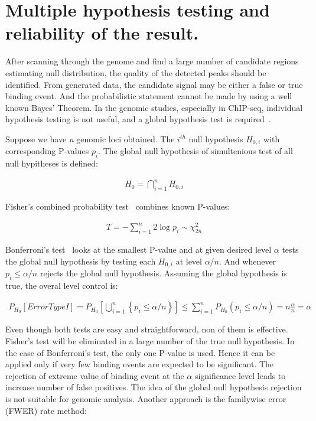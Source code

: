 \section{Multiple hypothesis testing and reliability of the result.}

After scanning through the genome and find a large number of candidate regions estimating null distribution, the quality of the detected peaks should be identified. 
From generated data, the candidate signal may be either a false or true binding event. 
And the probabilistic statement cannot be made by using a well known Bayes' Theorem. 
In the genomic studies, especially in ChIP-seq, individual hypothesis testing is not useful, and a global hypothesis test is required~\cite{futschik2019omnibus}. 

Suppose we have \textit{n} genomic loci obtained.
The $i^{th}$ null hypothesis $H_{0,i}$ with corresponding P-values $p_i$.
The global null hypothesis of simultenious test of all null hypitheses  is defined:

\begin{align*}
    H_0 = \displaystyle\bigcap_{i=1}^{n} H_{0, i}
\end{align*}

Fisher's combined probability test~\cite{fisher1992statistical} combines known P-values:

\begin{align*}
    T = - \displaystyle \sum_{i=1}^{n} 2 \log p_i \sim  \chi_{2n}^{2}
\end{align*}

Bonferroni's test~\cite{hommel1988stagewise} looks at the smallest P-value and at given desired level $\alpha$ tests the global null hypothesis by testing each $H_{0,i}$ at level $\alpha /n$. 
And whenever $p_i \leq \alpha / n$ rejects the global null hypothesis.
Assuming the global hypothesis is true, the overal level control is: 

\begin{align*}
    P_{H_0}[Error Type I] = P_{H_0} \left[\bigcup_{i=1}^{n} \left\{ p_i \leq \alpha / n\right\}\right] \leq \sum_{i=1}^{n} P_{H_0}(p_i \le \alpha / n)  = n \frac{\alpha}{n} = \alpha
\end{align*}

Even though both tests are easy and straightforward, non of them is effective. 
Fisher's test will be eliminated in a large number of the true null hypothesis. 
In the case of  Bonferroni's test, the only one P-value is used. 
Hence it can be applied only if very few binding events are expected to be significant. 
The rejection of extreme value of binding event at the $\alpha$ significance level leads to increase number of false positives. 
The idea of the global null hypothesis rejection is not suitable for genomic analysis. 
Another approach is the familywise error (FWER) rate method:

